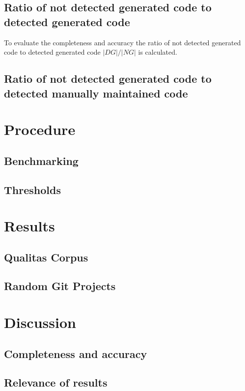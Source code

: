 \subsection{Ratio of not detected generated code to detected generated code}
To evaluate the completeness and accuracy the ratio of not detected generated code to detected generated code $|DG|/|NG|$ is calculated. 

\subsection{Ratio of not detected generated code to detected manually maintained code}

\section{Procedure}

\subsection{Benchmarking}
\label{section:benchmark}

\subsection{Thresholds}

\section{Results}

\subsection{Qualitas Corpus}

\subsection{Random Git Projects}

\section{Discussion}

\subsection{Completeness and accuracy}

\subsection{Relevance of results}

